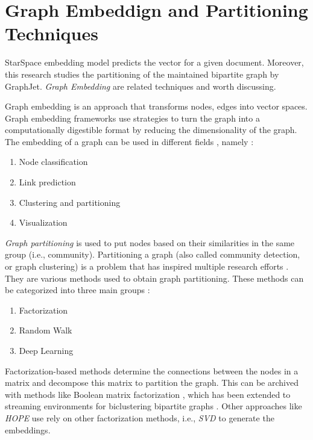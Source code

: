 \section{Graph Embeddign and Partitioning Techniques}
\label{sec:graph-partitioning-techniques}
StarSpace embedding model predicts the vector for a given document. Moreover, this research studies the partitioning of the maintained bipartite graph by GraphJet. \emph{Graph Embedding} are related techniques and worth discussing.


Graph embedding is an approach that transforms nodes, edges into vector spaces. Graph embedding frameworks use strategies to turn the graph into a computationally digestible format by reducing the dimensionality of the graph. The embedding of a graph can be used in different fields \cite{goyalGraphEmbeddingTechniques2018}, namely : 

\begin{enumerate}
    \item Node classification
    \item Link prediction
    \item Clustering and partitioning
    \item Visualization
\end{enumerate}


\emph{Graph partitioning} is used to put nodes based on their similarities in the same group (i.e., community). Partitioning a graph (also called community detection, or graph clustering) is a problem that has inspired multiple research efforts \cite{fortunatoCommunityDetectionGraphs2010}. They are various methods used to obtain graph partitioning. These methods can be categorized into three main groups \cite{goyalGraphEmbeddingTechniques2018}:

\begin{enumerate}
    \item Factorization
    \item Random Walk
    \item Deep Learning
\end{enumerate}


Factorization-based methods determine the connections between the nodes in a matrix and decompose this matrix to partition the graph. This can be archived with methods like Boolean matrix factorization \cite{miettinenModelOrderSelection2011}, which has been extended to streaming environments for biclustering bipartite graphs \cite{neumannBiclusteringBooleanMatrix2020}. Other approaches like \emph{HOPE} \cite{ouAsymmetricTransitivityPreserving2016b} use rely on other factorization methods, i.e., \emph{SVD} \cite{vanloanGeneralizingSingularValue1976} to generate the embeddings.


